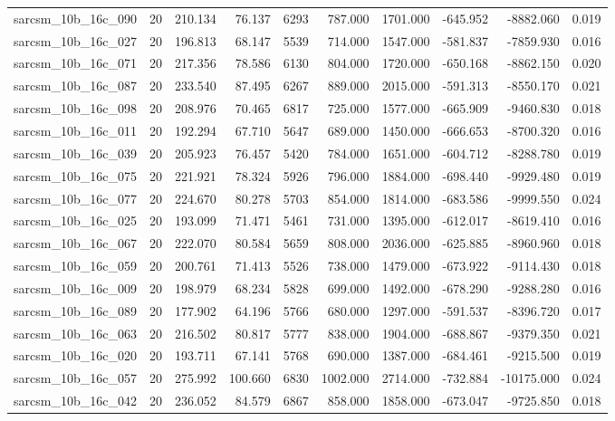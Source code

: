 \begin{tabular}{lrrrrrrrrr}
sarcsm\_10b\_16c\_090 & 20 & 210.134 & 76.137 & 6293 & 787.000 & 1701.000 & -645.952 & -8882.060 & 0.019 \\
sarcsm\_10b\_16c\_027 & 20 & 196.813 & 68.147 & 5539 & 714.000 & 1547.000 & -581.837 & -7859.930 & 0.016 \\
sarcsm\_10b\_16c\_071 & 20 & 217.356 & 78.586 & 6130 & 804.000 & 1720.000 & -650.168 & -8862.150 & 0.020 \\
sarcsm\_10b\_16c\_087 & 20 & 233.540 & 87.495 & 6267 & 889.000 & 2015.000 & -591.313 & -8550.170 & 0.021 \\
sarcsm\_10b\_16c\_098 & 20 & 208.976 & 70.465 & 6817 & 725.000 & 1577.000 & -665.909 & -9460.830 & 0.018 \\
sarcsm\_10b\_16c\_011 & 20 & 192.294 & 67.710 & 5647 & 689.000 & 1450.000 & -666.653 & -8700.320 & 0.016 \\
sarcsm\_10b\_16c\_039 & 20 & 205.923 & 76.457 & 5420 & 784.000 & 1651.000 & -604.712 & -8288.780 & 0.019 \\
sarcsm\_10b\_16c\_075 & 20 & 221.921 & 78.324 & 5926 & 796.000 & 1884.000 & -698.440 & -9929.480 & 0.019 \\
sarcsm\_10b\_16c\_077 & 20 & 224.670 & 80.278 & 5703 & 854.000 & 1814.000 & -683.586 & -9999.550 & 0.024 \\
sarcsm\_10b\_16c\_025 & 20 & 193.099 & 71.471 & 5461 & 731.000 & 1395.000 & -612.017 & -8619.410 & 0.016 \\
sarcsm\_10b\_16c\_067 & 20 & 222.070 & 80.584 & 5659 & 808.000 & 2036.000 & -625.885 & -8960.960 & 0.018 \\
sarcsm\_10b\_16c\_059 & 20 & 200.761 & 71.413 & 5526 & 738.000 & 1479.000 & -673.922 & -9114.430 & 0.018 \\
sarcsm\_10b\_16c\_009 & 20 & 198.979 & 68.234 & 5828 & 699.000 & 1492.000 & -678.290 & -9288.280 & 0.016 \\
sarcsm\_10b\_16c\_089 & 20 & 177.902 & 64.196 & 5766 & 680.000 & 1297.000 & -591.537 & -8396.720 & 0.017 \\
sarcsm\_10b\_16c\_063 & 20 & 216.502 & 80.817 & 5777 & 838.000 & 1904.000 & -688.867 & -9379.350 & 0.021 \\
sarcsm\_10b\_16c\_020 & 20 & 193.711 & 67.141 & 5768 & 690.000 & 1387.000 & -684.461 & -9215.500 & 0.019 \\
sarcsm\_10b\_16c\_057 & 20 & 275.992 & 100.660 & 6830 & 1002.000 & 2714.000 & -732.884 & -10175.000 & 0.024 \\
sarcsm\_10b\_16c\_042 & 20 & 236.052 & 84.579 & 6867 & 858.000 & 1858.000 & -673.047 & -9725.850 & 0.018 \\

\end{tabular}
